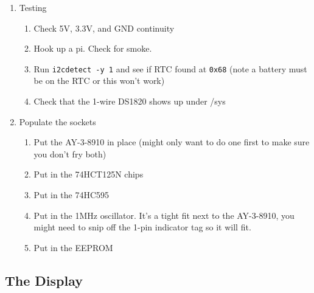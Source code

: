 \documentclass[11pt]{article}
\begin{document}
\begin{enumerate}
\item Testing
	\begin{enumerate}
		\item Check 5V, 3.3V, and GND continuity
		\item Hook up a pi.  Check for smoke.
		\item Run {\tt i2cdetect -y 1} and see if RTC found at {\tt 0x68}
			(note a battery must be on the RTC or this won't work)
		\item Check that the 1-wire DS1820 shows up under /sys
	\end{enumerate}
			
\item Populate the sockets
	\begin{enumerate}
		\item Put the AY-3-8910 in place (might only want to do one first
			to make sure you don't fry both)
		\item Put in the 74HCT125N chips
		\item Put in the 74HC595
		\item Put in the 1MHz oscillator.  It's a tight fit next to the AY-3-8910,
			you might need to snip off the 1-pin indicator tag so it will fit.
		\item Put in the EEPROM
	\end{enumerate}
\end{enumerate}


		


\subsection{The Display}
\end{document}
